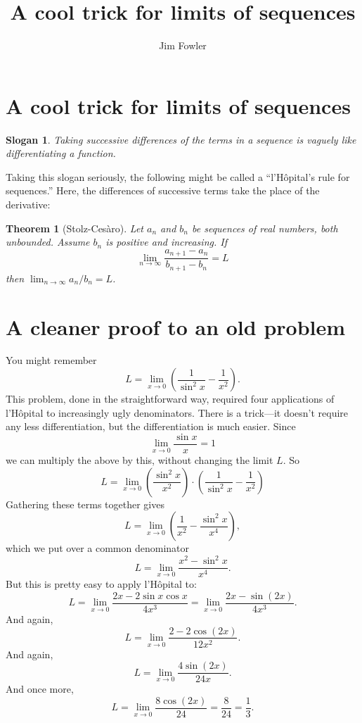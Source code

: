 \documentclass[11pt,letterpaper]{article}
\title{A cool trick for limits of sequences}
\author{Jim Fowler}
\newtheorem*{theorem*}{Theorem}
\newtheorem*{slogan*}{Slogan}
\begin{document}
\section*{A cool trick for limits of sequences}

\begin{slogan*}
  Taking successive differences of the terms in a sequence is vaguely
  like differentiating a function.
\end{slogan*}
Taking this slogan seriously, the following might be called a
``l'H\^opital's rule for sequences.''  Here, the differences of
successive terms take the place of the derivative:
\begin{theorem*}[Stolz-Ces\`aro]
  Let $a_n$ and $b_n$ be sequences of real numbers, both unbounded.
  Assume $b_n$ is positive and increasing.  If
$$
\lim_{n \to \infty} \frac{a_{n+1} - a_n}{b_{n+1} - b_n} = L
$$
then $\displaystyle\lim_{n\to\infty} a_n/b_n = L$.
\end{theorem*}

\section*{A cleaner proof to an old problem}

You might remember
$$
L = \lim_{x \to 0} \left( \frac{1}{\sin^2 x} - \frac{1}{x^2} \right).
$$
This problem, done in the straightforward way, required four
applications of l'H\^opital to increasingly ugly denominators.  There
is a trick---it doesn't require any less differentiation, but the
differentiation is much easier.  Since
$$
\lim_{x \to 0} \frac{\sin x}{x} = 1
$$
we can multiply the above by this, without changing the limit $L$.  So
$$
L = \lim_{x \to 0} \left( \frac{\sin^2 x}{x^2} \right) \cdot \left( \frac{1}{\sin^2 x} - \frac{1}{x^2} \right)
$$
Gathering these terms together gives
$$
L = \lim_{x \to 0} \left( \frac{1}{x^2} - \frac{\sin^2 x}{x^4} \right),
$$
which we put over a common denominator
$$
L = \lim_{x \to 0} \frac{x^2 - \sin^2 x}{x^4}.
$$
But this is pretty easy to apply l'H\^opital to:
$$
L = \lim_{x \to 0} \frac{2 x - 2 \sin x \cos x}{4 x^3} = 
\lim_{x \to 0} \frac{2 x - \sin (2x)}{4 x^3}.
$$
And again,
$$
L = \lim_{x \to 0} \frac{2 - 2 \cos (2x)}{12 x^2}.
$$
And again,
$$
L = \lim_{x \to 0} \frac{4 \sin (2x)}{24 x}.
$$
And once more,
$$
L = \lim_{x \to 0} \frac{8 \cos (2x)}{24} = \frac{8}{24} = \frac{1}{3}.
$$
\end{document}

